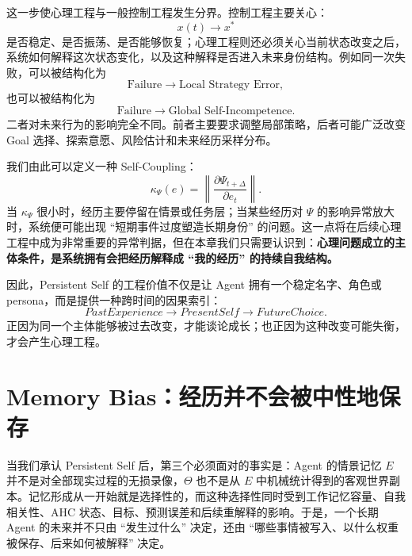 这一步使心理工程与一般控制工程发生分界。控制工程主要关心：
\begin{equation}
    x(t)\rightarrow x^{*}
\end{equation}
是否稳定、是否振荡、是否能够恢复；心理工程则还必须关心当前状态改变之后，系统如何解释这次状态变化，以及这种解释是否进入未来身份结构。例如同一次失败，可以被结构化为
\begin{equation}
    \text{Failure}
    \rightarrow
    \text{Local Strategy Error},
\end{equation}
也可以被结构化为
\begin{equation}
    \text{Failure}
    \rightarrow
    \text{Global Self-Incompetence}.
\end{equation}
二者对未来行为的影响完全不同。前者主要要求调整局部策略，后者可能广泛改变 Goal 选择、探索意愿、风险估计和未来经历采样分布。

我们由此可以定义一种 Self-Coupling：
\begin{equation}
    \kappa_{\Psi}(e)
    =
    \left\|
    \frac{\partial \Psi_{t+\Delta}}
    {\partial e_t}
    \right\|.
\end{equation}
当 $\kappa_{\Psi}$ 很小时，经历主要停留在情景或任务层；当某些经历对 $\Psi$ 的影响异常放大时，系统便可能出现 ``短期事件过度塑造长期身份'' 的问题。这一点将在后续心理工程中成为非常重要的异常判据，但在本章我们只需要认识到：\textbf{心理问题成立的主体条件，是系统拥有会把经历解释成 ``我的经历'' 的持续自我结构。}

因此，Persistent Self 的工程价值不仅是让 Agent 拥有一个稳定名字、角色或 persona，而是提供一种跨时间的因果索引：
\begin{equation}
    PastExperience
    \rightarrow
    PresentSelf
    \rightarrow
    FutureChoice.
\end{equation}
正因为同一个主体能够被过去改变，才能谈论成长；也正因为这种改变可能失衡，才会产生心理工程。

\section{Memory Bias：经历并不会被中性地保存}
\label{sec:memory-bias-origin}

当我们承认 Persistent Self 后，第三个必须面对的事实是：Agent 的情景记忆 $E$ 并不是对全部现实过程的无损录像，$\Theta$ 也不是从 $E$ 中机械统计得到的客观世界副本。记忆形成从一开始就是选择性的，而这种选择性同时受到工作记忆容量、自我相关性、AHC 状态、目标、预测误差和后续重解释的影响。于是，一个长期 Agent 的未来并不只由 ``发生过什么'' 决定，还由 ``哪些事情被写入、以什么权重被保存、后来如何被解释'' 决定。

